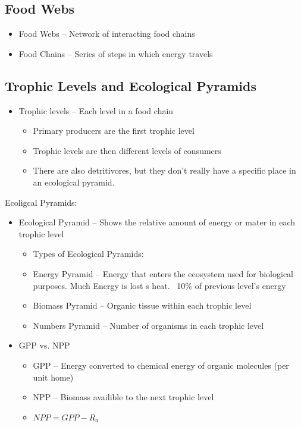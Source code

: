 \documentclass{article}
\begin{document}
\subsection{Food Webs}
\begin{itemize}
\item Food Webs -- Network of interacting food chains
\item Food Chains -- Series of steps in which energy travels
\end{itemize}

\subsection{Trophic Levels and Ecological Pyramids}
\begin{itemize}
\item Trophic levels -- Each level in a food chain
\begin{itemize}
\item Primary producers are the first trophic level
\item Trophic levels are then different levels of consumers
\item There are also detritivores, but they don't really have a specific place in an ecological pyramid.
\end{itemize}
\end{itemize}

Ecoligcal Pyramids:
\begin{itemize}
\item Ecological Pyramid -- Shows the relative amount of energy or mater in each trophic level
\begin{itemize}
\item Types of Ecological Pyramids:
\item Energy Pyramid -- Energy that enters the ecosystem used for biological purposes. Much Energy is lost s heat. ~10\% of previous level's energy
\item Biomass Pyramid -- Organic tissue within each trophic level
\item Numbers Pyramid -- Number of organisms in each trophic level
\end{itemize}
\item GPP vs. NPP
\begin{itemize}
\item GPP -- Energy converted to chemical energy of organic molecules (per unit home)%
\item NPP -- Biomass availible to the next trophic level
\item $NPP=GPP-R_a$
\end{itemize}
\end{itemize}
\end{document}

